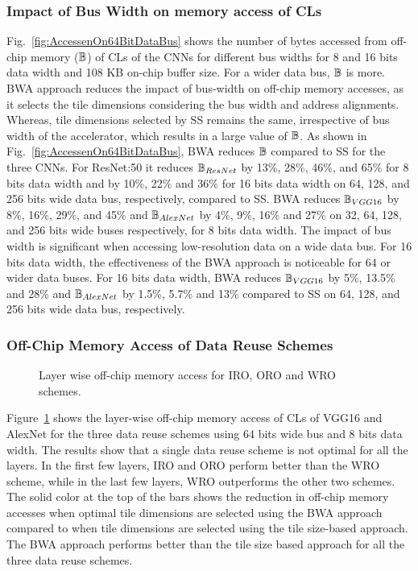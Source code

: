 \subsubsection{Impact of Bus Width on memory access of CLs}
Fig.~\ref{fig:AccessenOn64BitDataBus} shows the number of bytes accessed from off-chip memory ($\mathbb{B}$) of CLs of the CNNs for different bus widths for 8 and 16 bits data width and 108 KB on-chip buffer size. For a wider data bus, $\mathbb{B}$ is more. BWA approach reduces the impact of bus-width on off-chip memory accesses, as it selects the tile dimensions considering the bus width and address alignments. Whereas, tile dimensions selected by SS remains the same, irrespective of bus width of the accelerator, which results in a large value of $\mathbb{B}$.
As shown in Fig.~\ref{fig:AccessenOn64BitDataBus}, BWA reduces $\mathbb{B}$ compared to SS for the three CNNs. For ResNet:50 it reduces $\mathbb{B}_{ResNet}$ by 13\%, 28\%, 46\%, and 65\% for 8 bits data width and by 10\%, 22\% and 36\% for 16 bits data width on 64, 128, and 256 bits wide data bus, respectively, compared to SS. 
BWA reduces $\mathbb{B}_{VGG16}$ by 8\%, 16\%, 29\%, and 45\% and $\mathbb{B}_{AlexNet}$ by 4\%, 9\%, 16\% and 27\% on 32, 64, 128, and 256 bits wide buses respectively, for 8 bits data width. 
The impact of bus width is significant when accessing low-resolution data on a wide data bus. For 16 bits data width, the effectiveness of the BWA approach is noticeable for 64 or wider data buses. For 16 bits data width, BWA reduces $\mathbb{B}_{VGG16}$ by 5\%, 13.5\% and 28\% and $\mathbb{B}_{AlexNet}$ by 1.5\%, 5.7\% and 13\% compared to SS on 64, 128, and 256 bits wide data bus, respectively.
\subsubsection{Off-Chip Memory Access of Data Reuse  Schemes}\label{sec:ResultsDataReuseScheme}
\begin{figure}[htb]
	\centering
	\hfil
	\hfil	
	\caption{Layer wise off-chip memory access for IRO, ORO and WRO schemes.}
	\label{fig:DataReuseSchemeCompare}
	\vspace{-1.0em}	
\end{figure}
Figure~\ref{fig:DataReuseSchemeCompare} shows the layer-wise off-chip memory access of CLs of VGG16 and AlexNet for the three data reuse schemes using 64 bits wide bus and 8 bits data width. The results show that a single data reuse scheme is not optimal for all the layers. In the first few layers, IRO and ORO perform better than the WRO scheme, while in the last few layers, WRO outperforms the other two schemes. The solid color at the top of the bars shows the reduction in off-chip memory accesses when optimal tile dimensions are selected using the BWA approach compared to when tile dimensions are selected using the tile size-based approach. The BWA approach performs better than the tile size based approach for all the three data reuse schemes.
